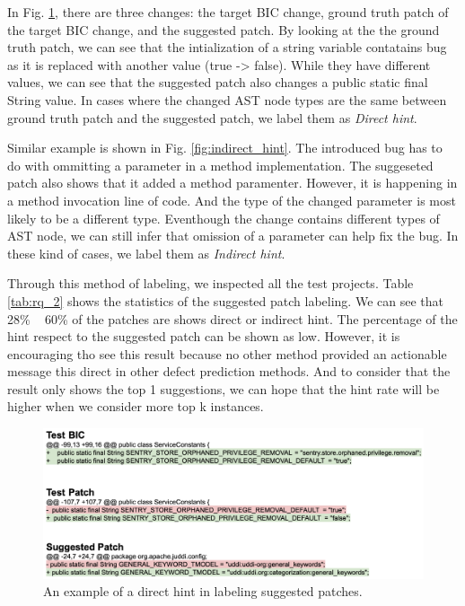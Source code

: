 In Fig. \ref{fig:direct_hint}, there are three changes: the target BIC change, ground truth patch of the target BIC change, and the suggested patch. 
By looking at the the ground truth patch, we can see that the intialization of a string variable contatains bug as it is replaced with another value (true -> false).
While they have different values, we can see that the suggested patch also changes a public static final String value.
In cases where the changed AST node types are the same between ground truth patch and the suggested patch, we label them as \emph{Direct hint}.

Similar example is shown in Fig. \ref{fig:indirect_hint}.
The introduced bug has to do with ommitting a parameter in a method implementation.
The suggeseted patch also shows that it added a method paramenter.
However, it is happening in a method invocation line of code.
And the type of the changed parameter is most likely to be a different type.
Eventhough the change contains different types of AST node, we can still infer that omission of a parameter can help fix the bug.
In these kind of cases, we label them as \emph{Indirect hint}.

Through this method of labeling, we inspected all the test projects.
Table \ref{tab:rq_2} shows the statistics of the suggested patch labeling.
We can see that 28\% ~ 60\% of the patches are shows direct or indirect hint.
The percentage of the hint respect to the suggested patch can be shown as low.
However, it is encouraging tho see this result because no other method provided an actionable message this direct in other defect prediction methods.
And to consider that the result only shows the top 1 suggestions, we can hope that the hint rate will be higher when we consider more top k instances.

\begin{figure}[!tbp]
\renewcommand{\arraystretch}{1}
    \centering
    \includegraphics[width=\textwidth]{figures/direct_hint.png}\hfill
    \caption{An example of a direct hint in labeling suggested patches.}
    \label{fig:direct_hint}
\end{figure}

